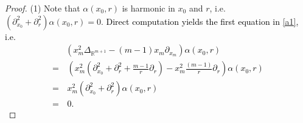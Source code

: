 \documentclass{amsart}
\theoremstyle{definition}
\theoremstyle{remark}
\numberwithin{equation}{section}
\begin{document}
\begin{proof} %

(1) Note that $\alpha(x_{0}, r)$ is harmonic in $x_{0}$ and $r$, i.e.  $(\partial^{2}_{x_{0}}+\partial_{r}^{2})\alpha(x_{0}, r)=0$. \textcolor{black}{Direct computation yields
the first equation in \eqref{a1}, i.e.
\begin{equation*}
\begin{split}
     &\left(x_{m}^{2}\Delta_{\mathbb{R}^{m+1}} -(m-1)x_{m} \partial_{x_{m}}\right)\alpha(x_{0}, r)\\
     = & \,\left(x_{m}^{2} \left(\partial_{x_{0}}^{2}+\partial_{r}^{2}+\frac{m-1}{r}\partial_{r}\right)-x_{m}^{2} \frac{(m-1)}{r}\partial_{r} \right)\alpha(x_{0}, r) \\
     = & \, x_{m}^{2}\left(\partial^{2}_{x_{0}}+\partial_{r}^{2}\right)\alpha(x_{0}, r)\\
     = & \, 0.
\end{split}
\end{equation*}}


\end{proof}
\end{document}
